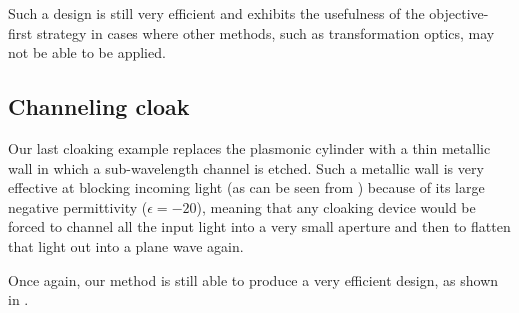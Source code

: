 Such a design is still very efficient
    and exhibits the usefulness of the objective-first strategy
    in cases where other methods, such as transformation optics,
    may not be able to be applied.

\subsection{Channeling cloak}
Our last cloaking example replaces the plasmonic cylinder 
    with a thin metallic wall in which a sub-wavelength channel is etched.
Such a metallic wall is very effective at blocking incoming light
    (as can be seen from ) 
    because of its large negative permittivity ($\epsilon = -20$),
    meaning that any cloaking device would be forced to channel
    all the input light into a very small aperture
    and then to flatten that light out into a plane wave again.

Once again, our method is still able to produce a very efficient design,
    as shown in .


